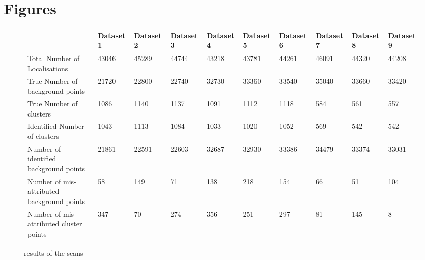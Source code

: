 \documentclass[11pt]{article}
\begin{document}
		


\section{Figures}
\begin{figure}
	\begin{tabular}{ | m{1.5cm} | m{1.5cm} |m{1.5cm} |m{1.5cm} |m{1.5cm} |m{1.5cm} |m{1.5cm} |m{1.5cm} |m{1.5cm} |m{1.5cm} | } 
		\hline
		 & Dataset 1 & Dataset 2 &Dataset 3& Dataset 4&Dataset 5&Dataset 6& Dataset 7&Dataset 8&Dataset 9\\ 
		\hline
		 Total Number of Localisations
		 & 43046 & 45289 & 44744 &43218 & 43781 &44261 & 46091& 44320 & 44208\\ 
		\hline
		True Number of background points
		& 21720 & 22800& 22740 & 32730 & 33360 &33540 & 35040 & 33660 & 33420\\ 
		\hline
		True Number of clusters
		& 1086 & 1140 & 1137 & 1091 & 1112 &1118 & 584& 561& 557\\ 
		\hline
		Identified Number of clusters
		& 1043 & 1113 & 1084& 1033 & 1020 &1052 & 569&542 & 542\\ 
		\hline 
		Number of identified background points
		& 21861 & 22591 & 22603& 32687 & 32930 &33386 & 34479&33374 & 33031\\ 
\hline
		Number of mis-attributed background points
		& 58 & 149 & 71 &138 & 218& 154& 66& 51 &104\\ 
		\hline
		Number of mis-attributed cluster points
		& 347 & 70 & 274 &356 & 251& 297 & 81& 145&8\\ 
\hline
		
	\end{tabular}
\caption{results of the scans}
\label{syntheticTable}
\end{figure}
\end{document}
